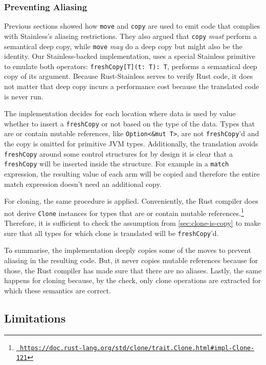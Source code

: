 \subsubsection{Preventing Aliasing}

Previous sections showed how \lstinline!move! and \lstinline!copy! are used to
emit code that complies with Stainless's aliasing restrictions. They also argued
that \lstinline!copy! \emph{must} perform a semantical deep copy, while
\lstinline!move! \emph{may} do a deep copy but might also be the identity. Our
Stainless-backed implementation, uses a special Stainless primitive to emulate
both operators: \lstinline!freshCopy[T](t: T): T!, performs a semantical deep
copy of its argument. Because Rust-Stainless serves to verify Rust code, it does
not matter that deep copy incurs a performance cost because the translated code
is never run.

The implementation decides for each location where data is used by value whether
to insert a \lstinline!freshCopy! or not based on the type of the data. Types
that are or contain mutable references, like \lstinline!Option<&mut T>!, are not
\lstinline!freshCopy!'d and the copy is omitted for primitive JVM types.
Additionally, the translation avoids \lstinline!freshCopy! around some control
structures for by design it is clear that a \lstinline!freshCopy! will be
inserted inside the structure. For example in a \lstinline!match! expression,
the resulting value of each arm will be copied and therefore the entire match
expression doesn't need an additional copy.

For cloning, the same procedure is applied. Conveniently, the Rust compiler does
not derive \lstinline!Clone! instances for types that are or contain mutable
references.\footnote{\href{}{\texttt{\color{MidnightBlue}
https://doc.rust-lang.org/std/clone/trait.Clone.html\#impl-Clone-121}}}
Therefore, it is sufficient to check the assumption from
\autoref{sec:clone-is-copy} to make sure that all types for which clone is
translated will be \lstinline!freshCopy!'d.

To summarise, the implementation deeply copies some of the moves to prevent
aliasing in the resulting code. But, it never copies mutable references because
for those, the Rust compiler has made sure that there are no aliases. Lastly,
the same happens for cloning because, by the check, only clone operations are
extracted for which these semantics are correct.


\subsection{Limitations}
\label{trans-limitations}

